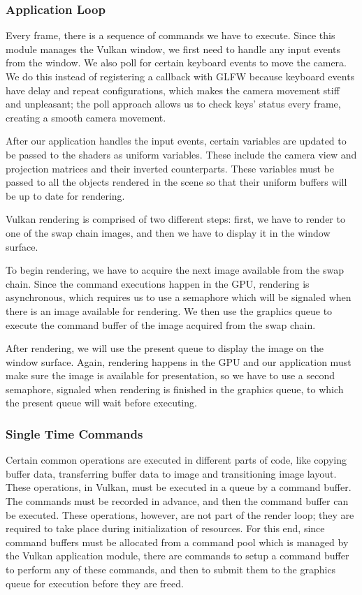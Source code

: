 \subsubsection{Application Loop}
Every frame, there is a sequence of commands we have to execute. Since this module manages the Vulkan window, we first need to handle any input events from the window. We also poll for certain keyboard events to move the camera. We do this instead of registering a callback with GLFW because keyboard events have delay and repeat configurations, which makes the camera movement stiff and unpleasant; the poll approach allows us to check keys' status every frame, creating a smooth camera movement.

After our application handles the input events, certain variables are updated to be passed to the shaders as uniform variables. These include the camera view and projection matrices and their inverted counterparts. These variables must be passed to all the objects rendered in the scene so that their uniform buffers will be up to date for rendering.

Vulkan rendering is comprised of two different steps: first, we have to render to one of the swap chain images, and then we have to display it in the window surface.

To begin rendering, we have to acquire the next image available from the swap chain. Since the command executions happen in the GPU, rendering is asynchronous, which requires us to use a semaphore which will be signaled when there is an image available for rendering. We then use the graphics queue to execute the command buffer of the image acquired from the swap chain.

After rendering, we will use the present queue to display the image on the window surface. Again, rendering happens in the GPU and our application must make sure the image is available for presentation, so we have to use a second semaphore, signaled when rendering is finished in the graphics queue, to which the present queue will wait before executing.

\subsubsection{Single Time Commands}
Certain common operations are executed in different parts of code, like copying buffer data, transferring buffer data to image and transitioning image layout. These operations, in Vulkan, must be executed in a queue by a command buffer. The commands must be recorded in advance, and then the command buffer can be executed. These operations, however, are not part of the render loop; they are required to take place during initialization of resources. For this end, since command buffers must be allocated from a command pool which is managed by the Vulkan application module, there are commands to setup a command buffer to perform any of these commands, and then to submit them to the graphics queue for execution before they are freed.

